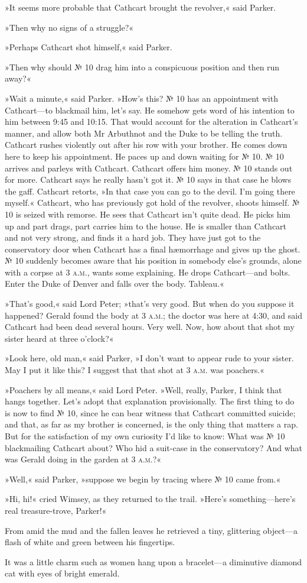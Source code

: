 »It seems more probable that Cathcart brought the revolver,« said Parker.

»Then why no signs of a struggle?«

»Perhaps Cathcart shot himself,« said Parker.

»Then why should № 10 drag him into a conspicuous position and then run away?«

»Wait a minute,« said Parker. »How's this? № 10 has an appointment with Cathcart—to blackmail him, let's say. He somehow gets word of his intention to him between 9:45 and 10:15. That would account for the alteration in Cathcart's manner, and allow both Mr Arbuthnot and the Duke to be telling the truth. Cathcart rushes violently out after his row with your brother. He comes down here to keep his appointment. He paces up and down waiting for № 10. № 10 arrives and parleys with Cathcart. Cathcart offers him money. № 10 stands out for more. Cathcart says he really hasn't got it. № 10 says in that case he blows the gaff. Cathcart retorts, »In that case you can go to the devil. I'm going there myself.« Cathcart, who has previously got hold of the revolver, shoots himself. № 10 is seized with remorse. He sees that Cathcart isn't quite dead. He picks him up and part drags, part carries him to the house. He is smaller than Cathcart and not very strong, and finds it a hard job. They have just got to the conservatory door when Cathcart has a final hæmorrhage and gives up the ghost. № 10 suddenly becomes aware that his position in somebody else's grounds, alone with a corpse at 3 \textsc{a.m.}, wants some explaining. He drops Cathcart—and bolts. Enter the Duke of Denver and falls over the body. Tableau.«

»That's good,« said Lord Peter; »that's very good. But when do you suppose it happened? Gerald found the body at 3 \textsc{a.m.}; the doctor was here at 4:30, and said Cathcart had been dead several hours. Very well. Now, how about that shot my sister heard at three o'clock?«

»Look here, old man,« said Parker, »I don't want to appear rude to your sister. May I put it like this? I suggest that that shot at 3 \textsc{a.m.} was poachers.«

»Poachers by all means,« said Lord Peter. »Well, really, Parker, I think that hangs together. Let's adopt that explanation provisionally. The first thing to do is now to find № 10, since he can bear witness that Cathcart committed suicide; and that, as far as my brother is concerned, is the only thing that matters a rap. But for the satisfaction of my own curiosity I'd like to know: What was № 10 blackmailing Cathcart about? Who hid a suit-case in the conservatory? And what was Gerald doing in the garden at 3 \textsc{a.m.}?«

»Well,« said Parker, »suppose we begin by tracing where № 10 came from.«

»Hi, hi!« cried Wimsey, as they returned to the trail. »Here's something—here's real treasure-trove, Parker!«

From amid the mud and the fallen leaves he retrieved a tiny, glittering object—a flash of white and green between his fingertips.

It was a little charm such as women hang upon a bracelet—a diminutive diamond cat with eyes of bright emerald.